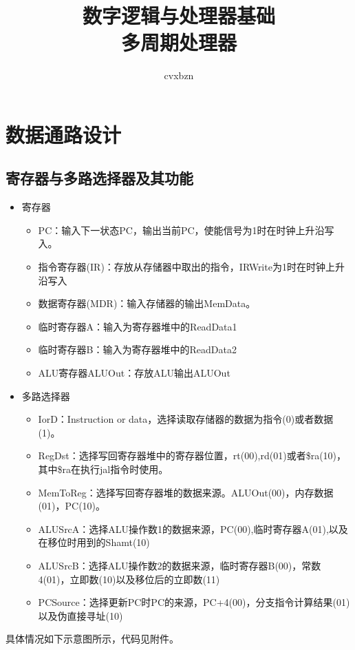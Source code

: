 \documentclass{article}
\title{数字逻辑与处理器基础\\多周期处理器}
\author{cvxbzn}
\begin{document}
\maketitle
\tableofcontents
\newpage
\section{数据通路设计}
\subsection{寄存器与多路选择器及其功能}
\begin{itemize}
    \item 寄存器
          \begin{itemize}
              \item PC：输入下一状态PC，输出当前PC，使能信号为1时在时钟上升沿写入。
              \item 指令寄存器(IR)：存放从存储器中取出的指令，IRWrite为1时在时钟上升沿写入
              \item 数据寄存器(MDR)：输入存储器的输出MemData。
              \item 临时寄存器A：输入为寄存器堆中的ReadData1
              \item 临时寄存器B：输入为寄存器堆中的ReadData2
              \item ALU寄存器ALUOut：存放ALU输出ALUOut
          \end{itemize}
    \item 多路选择器
          \begin{itemize}
              \item IorD：Instruction or data，选择读取存储器的数据为指令(0)或者数据(1)。
              \item RegDst：选择写回寄存器堆中的寄存器位置，rt(00),rd(01)或者\$ra(10)，其中\$ra在执行jal指令时使用。
              \item MemToReg：选择写回寄存器堆的数据来源。ALUOut(00)，内存数据(01)，PC(10)。
              \item ALUSrcA：选择ALU操作数1的数据来源，PC(00),临时寄存器A(01),以及在移位时用到的Shamt(10)
              \item ALUSrcB：选择ALU操作数2的数据来源，临时寄存器B(00)，常数4(01)，立即数(10)以及移位后的立即数(11)
              \item PCSource：选择更新PC时PC的来源，PC+4(00)，分支指令计算结果(01)以及伪直接寻址(10)
          \end{itemize}
\end{itemize}
具体情况如下示意图所示，代码见附件。
\end{document}
